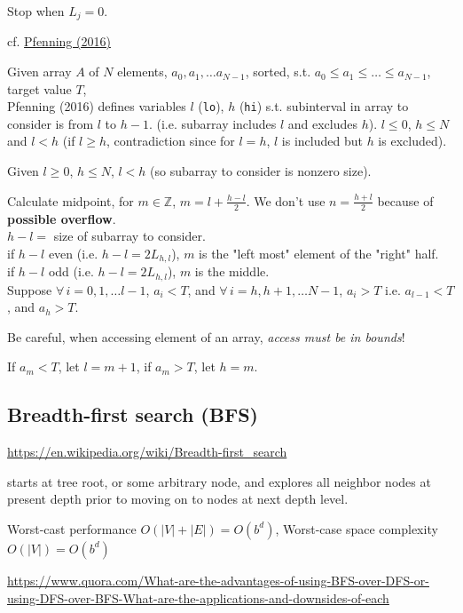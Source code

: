 \documentclass[10pt]{amsart}
\begin{document}
Stop when $L_j=0$.

cf. \href{https://web2.qatar.cmu.edu/~mhhammou/15122-s16/lectures/06-binsearch.pdf}{Pfenning (2016)}

Given array $A$ of $N$ elements, $a_0, a_1, \dots a_{N-1}$, sorted, s.t. $a_0 \leq a_1 \leq \dots \leq a_{N-1}$, target value $T$, \\
Pfenning (2016) defines variables $l$ (\texttt{lo}), $h$ (\texttt{hi}) s.t. subinterval in array to consider is from $l$ to $h-1$. (i.e. subarray includes $l$ and excludes $h$). $l\leq 0 $, $h\leq N$ and $l <h$ (if $l\geq h$, contradiction since for $l=h$, $l$ is included but $h$ is excluded).

Given $l\geq 0$, $h\leq N$, $l<h$ (so subarray to consider is nonzero size).

Calculate midpoint, for $m\in \mathbb{Z}$, $m = l + \frac{h-l}{2}$.  We don't use $n = \frac{h+l}{2}$ because of \textbf{possible overflow}. \\

$h-l =$ size of subarray to consider. \\
if $h-l$ even (i.e. $h-l = 2L_{h,l}$), $m$ is the "left most" element of the "right" half. \\
if $h-l$ odd (i.e. $h-l = 2L_{h,l}$), $m$ is the middle. \\

Suppose $\forall \, i = 0, 1, \dots l -1$, $a_i <T$, and $\forall \, i = h, h+1, \dots N-1$, $a_i >T$ i.e. $a_{l-1} < T$, and $a_h > T$. 

Be careful, when accessing element of an array, \emph{access must be in bounds}!

If $a_m < T$, let $l= m + 1$, if $a_m > T$, let $h=m$.


\subsection{Breadth-first search (BFS)}

\url{https://en.wikipedia.org/wiki/Breadth-first_search}

starts at tree root, or some arbitrary node, and explores all neighbor nodes at present depth prior to moving on to nodes at next depth level.

Worst-cast performance $O(|V|+|E|) = O(b^d)$, Worst-case space complexity $O(|V|) = O(b^d)$

\url{https://www.quora.com/What-are-the-advantages-of-using-BFS-over-DFS-or-using-DFS-over-BFS-What-are-the-applications-and-downsides-of-each}
\end{document}
